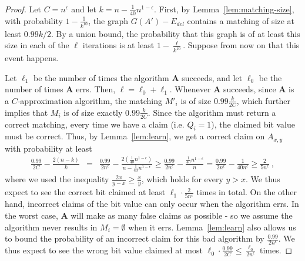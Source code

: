 \documentclass[10pt,a4paper]{article}
\begin{document}
\begin{proof}
Let $C = n^{\epsilon}$ and let $k = n - \frac{1}{40} n^{1-\epsilon}$.
 First, by Lemma~\ref{lem:matching-size}, with probability $1-\frac{1}{k^{10}}$, the graph 
 $G(A') - E_{del}$ contains a matching of size at least $0.99 k/ 2$. By a union bound, 
 the probability that this graph is of at least this size in each of the $\ell$ iterations  
 is at least $1 - \frac{\ell}{k^{10}}$. Suppose from now on that this event happens.

 Let $\ell_1$ be the number of times the algorithm $\mathbf{A}$ succeeds, and let $\ell_0$ be the number of times $\mathbf{A}$
 errs. Then, $\ell = \ell_0 + \ell_1$. Whenever $\mathbf{A}$ succeeds, since $\mathbf{A}$ is a $C$-approximation
 algorithm, the matching $M'_i$ is of size $0.99 \frac{k}{2C}$, which further implies that $M_i$ is of size exactly
 $0.99 \frac{k}{2C}$. Since the algorithm must return a correct matching, every time we have a claim (i.e. $Q_i = 1$), the claimed bit value must be correct. Thus, by Lemma~\ref{lem:learn}, we get a correct claim on $A_{x,y}$ with probability at least 
 \begin{eqnarray*}
  \frac{0.99}{2C} - \frac{2(n - k)}{k} & = & \frac{0.99}{2n^{\epsilon}} - \frac{2(\frac{1}{40} n^{1-\epsilon})}{n - \frac{1}{40} n^{1-\epsilon}} \ge  \frac{0.99}{2n^{\epsilon}} - \frac{\frac{1}{40} n^{1-\epsilon}}{n} = \frac{0.99}{2n^{\epsilon}} - \frac{1}{40n^{\epsilon}} \ge \frac{2}{5 n^\epsilon}   \ , \label{eqn:018}
 \end{eqnarray*}
where we used the inequality $\frac{2x}{y-x} \ge \frac{x}{y}$, which holds for every $y > x$. 
We thus expect to see the correct bit claimed at least $\ell_1 \cdot \frac{2}{5 n^\epsilon}$ times in total.
On the other hand, incorrect claims of the bit value can only occur when the algorithm errs. In the worst case, $\mathbf{A}$ 
will make as many false claims as possible - so we assume the algorithm never results in $M_i = \emptyset$ when it errs. 
Lemma~\ref{lem:learn} also allows us to bound the probability of an incorrect claim for this bad algorithm by $\frac{0.99}{2n^\epsilon}$. We thus expect to see the wrong bit value claimed at most $\ell_0 \cdot \frac{0.99}{2C} \le \frac{\ell_0}{2n^\epsilon}$ times.
 

\end{proof}
\end{document}
